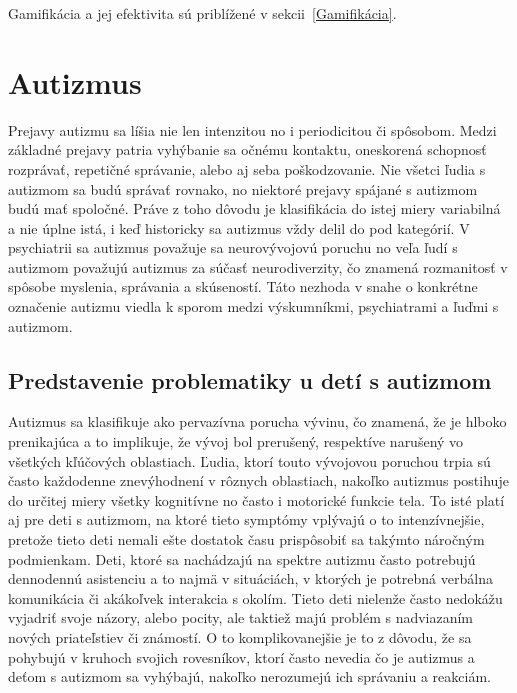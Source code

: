\documentclass[10pt,twoside,slovak,a4paper]{coursepaper}
\begin{document}
Gamifikácia a jej efektivita sú priblížené v sekcii~\ref{Gamifikácia}.


\section{Autizmus}\label{Autizmus} 
	Prejavy autizmu sa líšia nie len intenzitou no i periodicitou či spôsobom\cite{Autism_children}. Medzi základné prejavy patria vyhýbanie sa očnému kontaktu, oneskorená schopnosť rozprávať, repetičné správanie, alebo aj seba poškodzovanie.\cite{PLP-Framework} Nie všetci ľudia s autizmom sa budú správať rovnako, no niektoré prejavy spájané s autizmom budú mať spoločné. Práve z toho dôvodu je klasifikácia do istej miery variabilná a nie úplne istá, i keď historicky sa autizmus vždy delil do pod kategórií\cite{Autism_classification}. V psychiatrii sa autizmus považuje sa neurovývojovú poruchu no veľa ľudí s autizmom považujú autizmus za súčasť neurodiverzity, čo znamená rozmanitosť v spôsobe myslenia, správania a skúseností. Táto nezhoda v snahe o konkrétne označenie autizmu viedla k sporom medzi výskumníkmi, psychiatrami a ľuďmi s autizmom.\cite{Autism_classification}

\subsection{Predstavenie problematiky u detí s autizmom}\label{Predstavenie problematiky u detí s autizmom} 
	Autizmus sa klasifikuje ako pervazívna porucha vývinu, čo znamená, že je hlboko prenikajúca a to implikuje, že vývoj bol prerušený, respektíve narušený vo všetkých kľúčových oblastiach\cite{Autism}\cite{Autism_diagnosis}. Ľudia, ktorí touto vývojovou poruchou trpia sú často každodenne znevýhodnení v rôznych oblastiach, nakoľko autizmus postihuje do určitej miery všetky kognitívne no často i motorické funkcie tela. To isté platí aj pre deti s autizmom, na ktoré tieto symptómy vplývajú o to intenzívnejšie, pretože tieto deti nemali ešte dostatok času prispôsobiť sa takýmto náročným podmienkam. Deti, ktoré sa nachádzajú na spektre autizmu často potrebujú dennodennú asistenciu a to najmä v situáciách, v ktorých je potrebná verbálna komunikácia či akákoľvek interakcia s okolím.\cite{Autism_children} Tieto deti nielenže často nedokážu vyjadriť svoje názory, alebo pocity, ale taktiež majú problém s nadviazaním nových priateľstiev či známostí. O to komplikovanejšie je to z dôvodu, že sa pohybujú v kruhoch svojich rovesníkov, ktorí často nevedia čo je autizmus a deťom s autizmom sa vyhýbajú, nakoľko nerozumejú ich správaniu a reakciám.  
\end{document}
